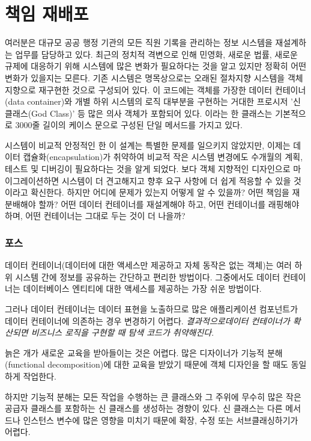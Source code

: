 \documentclass[a4paper,10pt,twoside]{book}
\begin{document}
	\renewcommand{\nnbb}[2]{} %
	\sloppy
\fi
\chapter{책임 재배포}

여러분은 대규모 공공 행정 기관의 모든 직원 기록을 관리하는 정보 시스템을 재설계하는 업무를 담당하고 있다. 최근의 정치적 격변으로 인해 민영화, 새로운 법률, 새로운 규제에 대응하기 위해 시스템에 많은 변화가 필요하다는 것을 알고 있지만 정확히 어떤 변화가 있을지는 모른다. 기존 시스템은 명목상으로는 오래된 절차지향 시스템을 객체 지향으로 재구현한 것으로 구성되어 있다. 이 코드에는 객체를 가장한 데이터 컨테이너(data container)와 개별 하위 시스템의 로직 대부분을 구현하는 거대한 프로시저 '신 클래스(God Class)' 등 많은 의사 객체가 포함되어 있다. 이라는 한 클래스는 기본적으로 3000줄 길이의 케이스 문으로 구성된 단일 메서드를 가지고 있다.

시스템이 비교적 안정적인 한 이 설계는 특별한 문제를 일으키지 않았지만, 이제는 데이터 캡슐화(encapsulation)가 취약하여 비교적 작은 시스템 변경에도 수개월의 계획, 테스트 및 디버깅이 필요하다는 것을 알게 되었다. 보다 객체 지향적인 디자인으로 마이그레이션하면 시스템이 더 견고해지고 향후 요구 사항에 더 쉽게 적응할 수 있을 것이라고 확신한다. 하지만 어디에 문제가 있는지 어떻게 알 수 있을까? 어떤 책임을 재분배해야 할까? 어떤 데이터 컨테이너를 재설계해야 하고, 어떤 컨테이너를 래핑해야 하며, 어떤 컨테이너는 그대로 두는 것이 더 나을까?

\subsection*{포스}

\begin{bulletlist}
\item 데이터 컨테이너(데이터에 대한 액세스만 제공하고 자체 동작은 없는 객체)는 여러 하위 시스템 간에 정보를 공유하는 간단하고 편리한 방법이다. 그중에서도 데이터 컨테이너는 데이터베이스 엔티티에 대한 액세스를 제공하는 가장 쉬운 방법이다.

\item 그러나 데이터 컨테이너는 데이터 표현을 노출하므로 많은 애플리케이션 컴포넌트가 데이터 컨테이너에 의존하는 경우 변경하기 어렵다. \emph{결과적으로데이터 컨테이너가 확산되면 비즈니스 로직을 구현할 때 탐색 코드가 취약해진다}.

\item 늙은 개가 새로운 교육을 받아들이는 것은 어렵다. 많은 디자이너가 기능적 분해(functional decomposition)에 대한 교육을 받았기 때문에 객체 디자인을 할 때도 동일하게 작업한다.

\item 하지만 기능적 분해는 모든 작업을 수행하는 큰 클래스와 그 주위에 무수히 많은 작은 공급자 클래스를 포함하는 신 클래스를 생성하는 경향이 있다. 신 클래스는 다른 메서드나 인스턴스 변수에 많은 영향을 미치기 때문에 확장, 수정 또는 서브클래싱하기가 어렵다.
\end{bulletlist}
\end{document}
